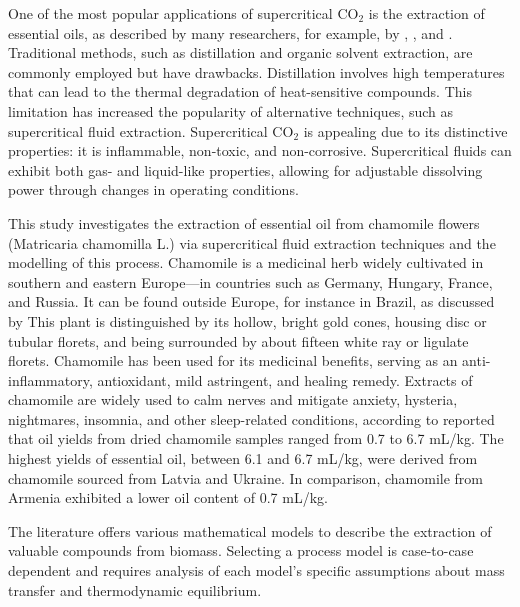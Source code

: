 \documentclass[a4paper,fleqn]{cas-dc}
\begin{document}
	One of the most popular applications of supercritical CO$_2$ is the extraction of essential oils, as described by many researchers, for example, by \citet{Sodeifian2017}, \citet{Reverchon1993}, and \citet{Sovova1994}. Traditional methods, such as distillation and organic solvent extraction, are commonly employed but have drawbacks. Distillation involves high temperatures that can lead to the thermal degradation of heat-sensitive compounds. This limitation has increased the popularity of alternative techniques, such as supercritical fluid extraction. Supercritical CO$_2$ is appealing due to its distinctive properties: it is inflammable, non-toxic, and non-corrosive. Supercritical fluids can exhibit both gas- and liquid-like properties, allowing for adjustable dissolving power through changes in operating conditions.
	
	
	This study investigates the extraction of essential oil from chamomile flowers (Matricaria chamomilla L.) via supercritical fluid extraction techniques and the modelling of this process. Chamomile is a medicinal herb widely cultivated in southern and eastern Europe—in countries such as Germany, Hungary, France, and Russia. It can be found outside Europe, for instance in Brazil, as discussed by \citet{Singh2011} This plant is distinguished by its hollow, bright gold cones, housing disc or tubular florets, and being surrounded by about fifteen white ray or ligulate florets. Chamomile has been used for its medicinal benefits, serving as an anti-inflammatory, antioxidant, mild astringent, and healing remedy. Extracts of chamomile are widely used to calm nerves and mitigate anxiety, hysteria, nightmares, insomnia, and other sleep-related conditions, according to \citet{Srivastava2009} \citet{Orav2010} reported that oil yields from dried chamomile samples ranged from 0.7 to 6.7 mL/kg. The highest yields of essential oil, between 6.1 and 6.7 mL/kg, were derived from chamomile sourced from Latvia and Ukraine. In comparison, chamomile from Armenia exhibited a lower oil content of 0.7 mL/kg.
	
	The literature offers various mathematical models to describe the extraction of valuable compounds from biomass. Selecting a process model is case-to-case dependent and requires analysis of each model's specific assumptions about mass transfer and thermodynamic equilibrium.
	
\end{document}
